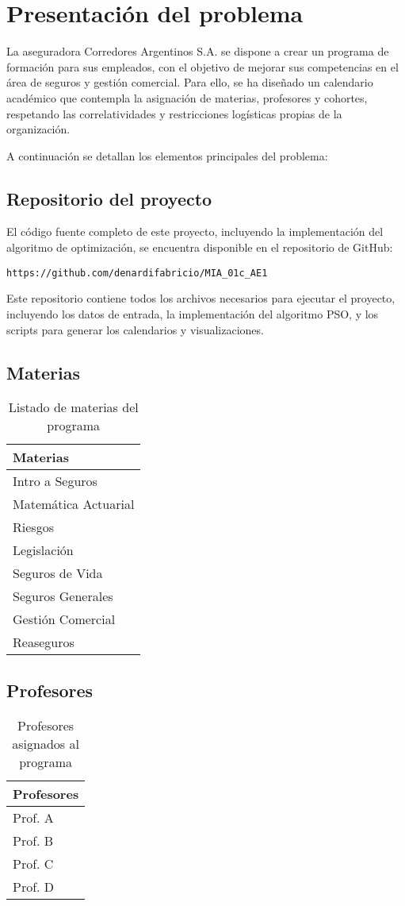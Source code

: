 \section{Presentación del problema}
La aseguradora Corredores Argentinos S.A. se dispone a crear un programa de formación para sus empleados, con el objetivo de mejorar sus competencias en el área de seguros y gestión comercial. Para ello, se ha diseñado un calendario académico que contempla la asignación de materias, profesores y cohortes, respetando las correlatividades y restricciones logísticas propias de la organización.

A continuación se detallan los elementos principales del problema:

\subsection*{Repositorio del proyecto}
El código fuente completo de este proyecto, incluyendo la implementación del algoritmo de optimización, se encuentra disponible en el repositorio de GitHub:

\texttt{https://github.com/denardifabricio/MIA\_01c\_AE1}

Este repositorio contiene todos los archivos necesarios para ejecutar el proyecto, incluyendo los datos de entrada, la implementación del algoritmo PSO, y los scripts para generar los calendarios y visualizaciones.

\subsection*{Materias}
\begin{table}[ht]
\centering
\begin{tabular}{|l|}
\hline
	\textbf{Materias} \\
\hline
Intro a Seguros \\
Matemática Actuarial \\
Riesgos \\
Legislación \\
Seguros de Vida \\
Seguros Generales \\
Gestión Comercial \\
Reaseguros \\
\hline
\end{tabular}
\caption{Listado de materias del programa}
\end{table}

\subsection*{Profesores}
\begin{table}[ht]
\centering
\begin{tabular}{|l|}
\hline
	\textbf{Profesores} \\
\hline
Prof. A \\
Prof. B \\
Prof. C \\
Prof. D \\
\hline
\end{tabular}
\caption{Profesores asignados al programa}
\end{table}

